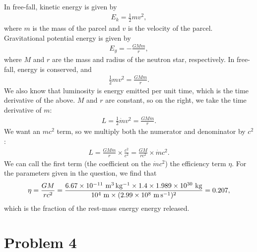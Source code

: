 \documentclass[11pt,letterpaper]{article}
\begin{document}
In free-fall, kinetic energy is given by 
\begin{align*}
    E_k = \frac{1}{2}mv^2,
\end{align*}
where $m$ is the mass of the parcel and $v$ is the velocity of the parcel. Gravitational potential energy is given by 
\begin{align*}
    E_g = -\frac{GMm}{r},
\end{align*}
where $M$ and $r$ are the mass and radius of the neutron star, respectively. In free-fall, energy is conserved, and 
\begin{align*}
    \frac{1}{2}mv^2 = \frac{GMm}{r}.
\end{align*}
We also know that luminosity is energy emitted per unit time, which is the time derivative of the above. $M$ and $r$ are constant, so on the right, we take the time derivative of $m$:
\begin{align*}
    L = \frac{1}{2}\dot{m}v^2 = \frac{GM\dot{m}}{r}.
\end{align*}
We want an $mc^2$ term, so we multiply both the numerator and denominator by $c^2$:
\begin{align*}
    L = \frac{GM\dot{m}}{r}\times \frac{c^2}{c^2} = \frac{GM}{rc^2}\times \dot{m}c^2.
\end{align*}
We can call the first term (the coefficient on the $\dot{m}c^2$) the efficiency term $\eta$. For the parameters given in the question, we find that 
\begin{align*}
    \eta = \frac{GM}{rc^2} = \frac{6.67\times 10^{-11}~{\rm m^3\,kg^{-1}\times 1.4\times 1.989\times 10^{30}~{\rm kg}}}{10^4~{\rm m}\times (2.99\times 10^{8}~{\rm m\,s^{-1}})^2} = 0.207,
\end{align*}
which is the fraction of the rest-mass energy energy released. 

\section*{Problem 4}
\end{document}
